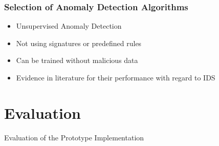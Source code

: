 \begin{frame}[c]
	\frametitle{Selection of Anomaly Detection Algorithms}
	
	\begin{itemize}
		\item Unsupervised Anomaly Detection
		\item Not using signatures or predefined rules
		\item Can be trained without malicious data
		\item Evidence in literature for their performance with regard to IDS \parencite{Lazarevic2003,Toshniwal2014}
	\end{itemize}
	
\end{frame}

\section{Evaluation}
\begin{frame}[c]
	\centering
	\LARGE Evaluation of the Prototype Implementation
	
\end{frame}

